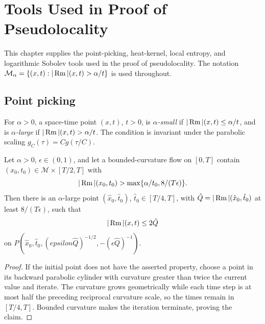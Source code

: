 \chapter{Tools Used in Proof of Pseudolocality}
\label{ch:chow-iii-tools-pseudolocality}

This chapter supplies the point-picking, heat-kernel, local entropy, and
logarithmic Sobolev tools used in the proof of pseudolocality.  The notation
\(\mathcal M_\alpha=\{(x,t):|\Rm|(x,t)>\alpha/t\}\) is used throughout.

\section{Point picking}

\begin{definition}
\label{def:chow-iii-alpha-small-large-curvature}
For \(\alpha>0\), a space-time point \((x,t)\), \(t>0\), is
\emph{\(\alpha\)-small} if \(|\operatorname{Rm}|(x,t)\le\alpha/t\), and is
\emph{\(\alpha\)-large} if \(|\operatorname{Rm}|(x,t)>\alpha/t\).  The condition is
invariant under the parabolic scaling \(g_C(\tau)=Cg(\tau/C)\).
\end{definition}

\begin{lemma}
\label{lem:chow-iii-large-curvature-local-control}
Let \(\alpha>0\), \(\epsilon\in(0,1)\), and let a bounded-curvature flow on
\([0,T]\) contain \((x_0,t_0)\in\mathcal M\times[T/2,T]\) with
\[
 |\operatorname{Rm}|(x_0,t_0)>\max\{\alpha/t_0,8/(T\epsilon)\}.
\]
Then there is an \(\alpha\)-large point \((\hat x_0,\hat t_0)\),
\(\hat t_0\in[T/4,T]\), with \(\hat Q=|\operatorname{Rm}|(\hat x_0,\hat t_0)\) at least
\(8/(T\epsilon)\), such that
\[
 |\operatorname{Rm}|(x,t)\le2\hat Q
\]
on \(P(\hat x_0,\hat t_0,(epsilon\hat Q)^{-1/2},-(\epsilon\hat Q)^{-1})\).
\end{lemma}
\begin{proof}
If the initial point does not have the asserted property, choose a point in
its backward parabolic cylinder with curvature greater than twice the current
value and iterate.  The curvature grows geometrically while each time step is
at most half the preceding reciprocal curvature scale, so the times remain in
\([T/4,T]\).  Bounded curvature makes the iteration terminate, proving the
claim.
\end{proof}

